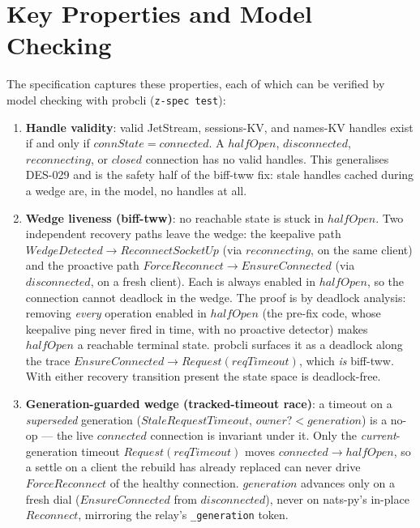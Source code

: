 \documentclass[a4paper,10pt,fleqn]{article}
\begin{document}
\section{Key Properties and Model Checking}
\label{sec:modelcheck}

The specification captures these properties, each of which can be
verified by model checking with probcli (\texttt{z-spec test}):

\begin{enumerate}
  \item \textbf{Handle validity}: valid JetStream, sessions-KV, and
    names-KV handles exist if and only if $connState = connected$.
    A $halfOpen$, $disconnected$, $reconnecting$, or $closed$
    connection has no valid handles.  This generalises DES-029 and
    is the safety half of the biff-tww fix: stale handles cached
    during a wedge are, in the model, no handles at all.

  \item \textbf{Wedge liveness (biff-tww)}: no reachable state is
    stuck in $halfOpen$.  Two independent recovery paths leave the
    wedge: the keepalive path $WedgeDetected \to ReconnectSocketUp$ (via
    $reconnecting$, on the same client) and the proactive path
    $ForceReconnect \to EnsureConnected$ (via $disconnected$, on a
    fresh client).  Each is always enabled in $halfOpen$, so the
    connection cannot deadlock in the wedge.  The proof is by
    deadlock analysis: removing \emph{every} operation enabled in
    $halfOpen$ (the pre-fix code, whose keepalive ping never fired
    in time, with no proactive detector) makes $halfOpen$ a
    reachable terminal state.  probcli surfaces it as a deadlock
    along the trace $EnsureConnected \to Request(reqTimeout)$,
    which \emph{is} biff-tww.  With either recovery transition
    present the state space is deadlock-free.

  \item \textbf{Generation-guarded wedge (tracked-timeout race)}: a
    timeout on a \emph{superseded} generation
    ($StaleRequestTimeout$, $owner? < generation$) is a no-op ---
    the live $connected$ connection is invariant under it.  Only
    the \emph{current}-generation timeout $Request(reqTimeout)$
    moves $connected \to halfOpen$, so a settle on a client the
    rebuild has already replaced can never drive $ForceReconnect$
    of the healthy connection.  $generation$ advances only on a
    fresh dial ($EnsureConnected$ from $disconnected$), never on
    nats-py's in-place $Reconnect$, mirroring the relay's
    \texttt{\_generation} token.


\end{enumerate}
\end{document}
